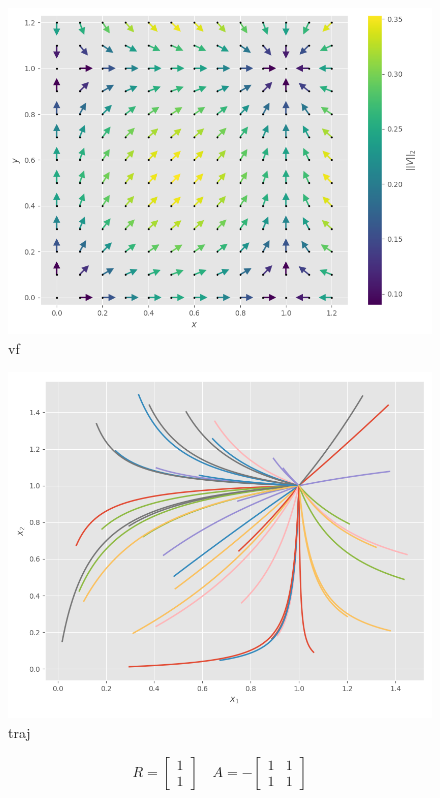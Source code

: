 \documentclass{wsdcr}
\begin{document}
\begin{figure}[t!]
    \centering
    \includegraphics[width=\linewidth]{fig/lv2_vfs0.png}
    \caption{vf}
    \label{fig:vfs0}
\end{figure}
\begin{figure}[t!]
    \centering
    \includegraphics[width=\linewidth]{fig/lv2_ts0.png}
    \caption{traj}
    \label{fig:ts0}
\end{figure}
\begin{equation}
R={\begin{bmatrix}1\\1\end{bmatrix}}\quad A =-{\begin{bmatrix}1&1\\1&1\end{bmatrix}}
\label{eq:RSnInv}
\end{equation}
\end{document}
